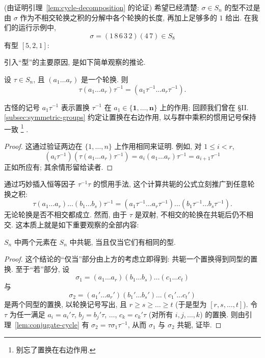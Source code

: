 (由证明引理~\ref{lem:cycle-decomposition} 的论证) 希望已经清楚: $\sigma \in S_n$ 的型不过是由 $\sigma$ 作为不相交轮换之积的分解中各个轮换的长度, 再加上足够多的 $1$ 给出. 在我们的运行示例中,
\[
\sigma = (1\,8\,6\,3\,2)(4\,7) \in S_8
\]
有型 $[5,2,1]$:
\begin{center}
\end{center}

引入``型''的主要原因, 是如下简单观察的推论.

\begin{lemma}
\label{lem:conjugate-cycle}
设 $\tau \in S_n$, 且 $(a_1 \dots a_r)$ 是一个轮换. 则
\[
\tau(a_1 \dots a_r)\tau^{-1} = (a_1\tau^{-1} \dots a_r\tau^{-1}).
\]
\end{lemma}

古怪的记号 $a_1\tau^{-1}$ 表示置换 $\tau^{-1}$ 在 $a_1 \in \{\mathbf{1},\dots,\mathbf{n}\}$ 上的作用; 回顾我们曾在 \S II.\ref{subsec:symmetric-groups} 约定让置换在右边作用, 以与群中乘积的惯用记号保持一致%
\footnote{别忘了置换在右边作用.}%
.

\begin{proof}
这通过验证两边在 $\{1,\dots,n\}$ 上作用相同来证明. 例如, 对 $1 \leq i < r$,
\[
(a_i\tau^{-1})(\tau(a_1 \dots a_r)\tau^{-1}) = a_i(a_1 \dots a_r)\tau^{-1} = a_{i+1}\tau^{-1}
\]
正如所应有; 其余情形留给读者.
\end{proof}

通过巧妙插入恒等因子 $\tau^{-1}\tau$ 的惯用手法, 这个计算共轭的公式立刻推广到任意轮换之积:
\[
\tau(a_1 \dots a_r)\dots(b_1 \dots b_s)\tau^{-1} = (a_1\tau^{-1} \dots a_r\tau^{-1})\dots(b_1\tau^{-1} \dots b_s\tau^{-1}).
\]
无论轮换是否不相交都成立. 然而, 由于 $\tau$ 是双射, 不相交的轮换在共轭后仍不相交. 这本质上就是如下重要观察的全部内容:

\begin{proposition}
\label{prop:conjugate-same-type}
$S_n$ 中两个元素在 $S_n$ 中共轭, 当且仅当它们有相同的型.
\end{proposition}

\begin{proof}
这个结论的``仅当''部分由上方的考虑立即得到: 共轭一个置换得到同型的置换. 至于``若''部分, 设
\[
\sigma_1 = (a_1 \dots a_r)(b_1 \dots b_s)\dots(c_1 \dots c_t)
\]
与
\[
\sigma_2 = (a_1' \dots a_r')(b_1' \dots b_s')\dots(c_1' \dots c_t')
\]
是两个同型的置换, 以轮换记号写出, 且 $r \geq s \geq \dots \geq t$ (于是型为 $[r,s,\dots,t]$). 令 $\tau$ 为任一满足 $a_i = a_i'\tau$, $b_j = b_j'\tau$, $\dots$, $c_k = c_k'\tau$ (对所有 $i,j,\dots,k$) 的置换. 则由引理~\ref{lem:conjugate-cycle} 有 $\sigma_2 = \tau\sigma_1\tau^{-1}$, 从而 $\sigma_1$ 与 $\sigma_2$ 共轭, 证毕.
\end{proof}

